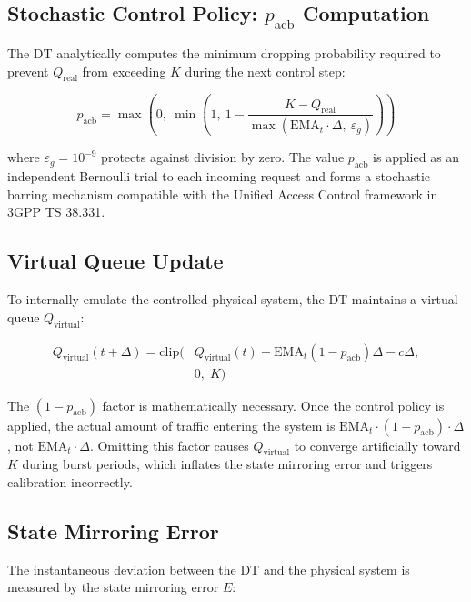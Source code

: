 \documentclass[conference]{IEEEtran}
\newcommand{\qreal}{Q_{\mathrm{real}}}
\newcommand{\qvirt}{Q_{\mathrm{virtual}}}
\newcommand{\pacb}{p_{\mathrm{acb}}}
\newcommand{\ema}{\mathrm{EMA}}
\begin{document}
\subsection{Stochastic Control Policy: $\pacb$ Computation}

The DT analytically computes the minimum dropping probability required to prevent $\qreal$ from exceeding $K$ during the next control step:

\begin{equation}
\pacb = \max\!\left(0,\ \min\!\left(1,\ 1 - \frac{K - \qreal}
    {\max(\ema_t \cdot \Delta,\ \varepsilon_g)}\right)\right)
\label{eq:pacb}
\end{equation}

where $\varepsilon_g = 10^{-9}$ protects against division by zero. The value $\pacb$ is applied as an independent Bernoulli trial to each incoming request and forms a stochastic barring mechanism compatible with the Unified Access Control framework in 3GPP TS 38.331.

\subsection{Virtual Queue Update}

To internally emulate the controlled physical system, the DT maintains a virtual queue $\qvirt$:

\begin{equation}
\begin{aligned}
\qvirt(t{+}\Delta) = \mathrm{clip}\!\big(&
    \qvirt(t) + \ema_t (1 - \pacb)\Delta - c\Delta,\\
    &0,\; K\big)
\end{aligned}
\label{eq:qvirtual}
\end{equation}

The $(1 - \pacb)$ factor is mathematically necessary. Once the control policy is applied, the actual amount of traffic entering the system is $\ema_t \cdot (1 - \pacb) \cdot \Delta$, not $\ema_t \cdot \Delta$. Omitting this factor causes $\qvirt$ to converge artificially toward $K$ during burst periods, which inflates the state mirroring error and triggers calibration incorrectly.

\subsection{State Mirroring Error}

The instantaneous deviation between the DT and the physical system is measured by the state mirroring error $E$:
\end{document}
